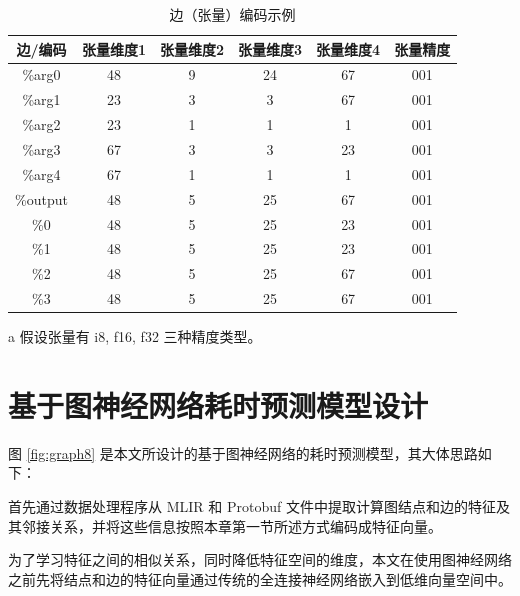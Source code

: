 \begin{table}[]
    \centering
    \caption{边（张量）编码示例}
    \begin{threeparttable}
    \begin{tabular}{|c|c|c|c|c|c|}
    \hline
    边/编码     & 张量维度1 & 张量维度2 & 张量维度3 & 张量维度4 & 张量精度 \\ \hline
    \%arg0   & 48    & 9     & 24    & 67    & 001\tnote{a} \\ \hline
    \%arg1   & 23    & 3     & 3     & 67    & 001  \\ \hline
    \%arg2   & 23    & 1     & 1     & 1     & 001  \\ \hline
    \%arg3   & 67    & 3     & 3     & 23    & 001  \\ \hline
    \%arg4   & 67    & 1     & 1     & 1     & 001  \\ \hline
    \%output & 48    & 5     & 25    & 67    & 001  \\ \hline
    \%0      & 48    & 5     & 25    & 23    & 001  \\ \hline
    \%1      & 48    & 5     & 25    & 23    & 001  \\ \hline
    \%2      & 48    & 5     & 25    & 67    & 001  \\ \hline
    \%3      & 48    & 5     & 25    & 67    & 001  \\ \hline
    \end{tabular}
    \begin{tablenotes}
        \footnotesize
        \item[a] 假设张量有 i8, f16, f32 三种精度类型。
    \end{tablenotes}
    \end{threeparttable}
    \label{tab:table2}
\end{table}

\section{基于图神经网络耗时预测模型设计}

图 \ref{fig:graph8} 是本文所设计的基于图神经网络的耗时预测模型，其大体思路如下：

首先通过数据处理程序从 MLIR 和 Protobuf 文件中提取计算图结点和边的特征及其邻接关系，并将这些信息按照本章第一节所述方式编码成特征向量。

为了学习特征之间的相似关系，同时降低特征空间的维度，本文在使用图神经网络之前先将结点和边的特征向量通过传统的全连接神经网络嵌入到低维向量空间中。

